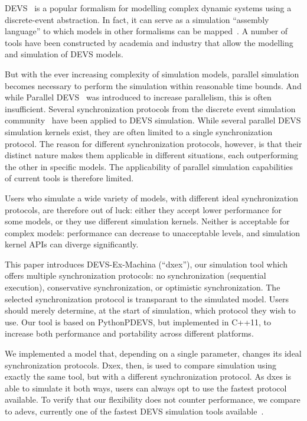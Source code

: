 \textsf{DEVS}~\cite{ClassicDEVS} is a popular formalism for modelling complex dynamic systems using a discrete-event abstraction.
In fact, it can serve as a simulation ``assembly language'' to which models in other formalisms can be mapped~\cite{DEVSbase}.
A number of tools have been constructed by academia and industry that allow the modelling and simulation of \textsf{DEVS} models.

But with the ever increasing complexity of simulation models, parallel simulation becomes necessary to perform the simulation within reasonable time bounds.
And while \textsf{Parallel DEVS}~\cite{ParallelDEVS} was introduced to increase parallelism, this is often insufficient.
Several synchronization protocols from the discrete event simulation community~\cite{FujimotoBook} have been applied to \textsf{DEVS} simulation.
While several parallel \textsf{DEVS} simulation kernels exist, they are often limited to a single synchronization protocol.
The reason for different synchronization protocols, however, is that their distinct nature makes them applicable in different situations, each outperforming the other in specific models.
The applicability of parallel simulation capabilities of current tools is therefore limited.

Users who simulate a wide variety of models, with different ideal synchronization protocols, are therefore out of luck:
either they accept lower performance for some models, or they use different simulation kernels.
Neither is acceptable for complex models: performance can decrease to unacceptable levels, and simulation kernel APIs can diverge significantly.

This paper introduces DEVS-Ex-Machina (``dxex''), our simulation tool which offers multiple synchronization protocols: no synchronization (sequential execution), conservative synchronization, or optimistic synchronization.
The selected synchronization protocol is transparant to the simulated model.
Users should merely determine, at the start of simulation, which protocol they wish to use.
Our tool is based on PythonPDEVS, but implemented in C++11, to increase both performance and portability across different platforms.

We implemented a model that, depending on a single parameter, changes its ideal synchronization protocols.
Dxex, then, is used to compare simulation using exactly the same tool, but with a different synchronization protocol.
As dxes is able to simulate it both ways, users can always opt to use the fastest protocol available.
To verify that our flexibility does not counter performance, we compare to adevs, currently one of the fastest \textsf{DEVS} simulation tools available~\cite{PythonPDEVS,DEVSSurvey}.

